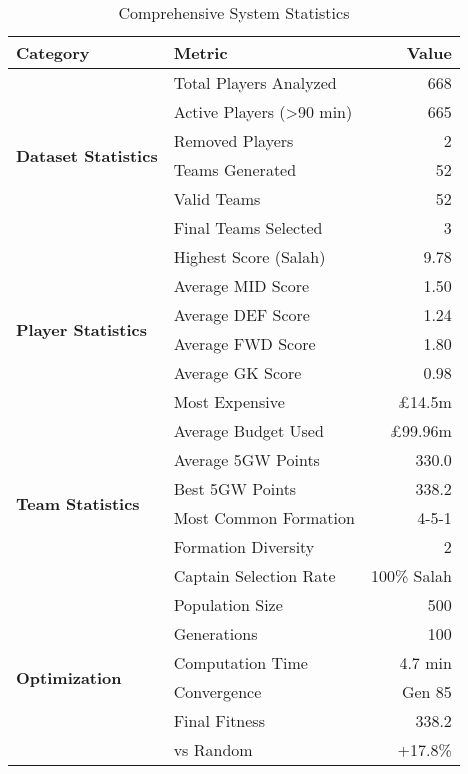 \begin{table}[h]
\centering
\caption{Comprehensive System Statistics}
\small
\begin{tabular}{llr}
\toprule
\textbf{Category} & \textbf{Metric} & \textbf{Value} \\
\midrule
\multirow{6}{*}{\textbf{Dataset Statistics}} & Total Players Analyzed & 668 \\
 & Active Players (>90 min) & 665 \\
 & Removed Players & 2 \\
 & Teams Generated & 52 \\
 & Valid Teams & 52 \\
 & Final Teams Selected & 3 \\
\midrule
\multirow{6}{*}{\textbf{Player Statistics}} & Highest Score (Salah) & 9.78 \\
 & Average MID Score & 1.50 \\
 & Average DEF Score & 1.24 \\
 & Average FWD Score & 1.80 \\
 & Average GK Score & 0.98 \\
 & Most Expensive & £14.5m \\
\midrule
\multirow{6}{*}{\textbf{Team Statistics}} & Average Budget Used & £99.96m \\
 & Average 5GW Points & 330.0 \\
 & Best 5GW Points & 338.2 \\
 & Most Common Formation & 4-5-1 \\
 & Formation Diversity & 2 \\
 & Captain Selection Rate & 100\% Salah \\
\midrule
\multirow{6}{*}{\textbf{Optimization}} & Population Size & 500 \\
 & Generations & 100 \\
 & Computation Time & 4.7 min \\
 & Convergence & Gen 85 \\
 & Final Fitness & 338.2 \\
 & vs Random & +17.8\% \\
\bottomrule
\end{tabular}
\end{table}